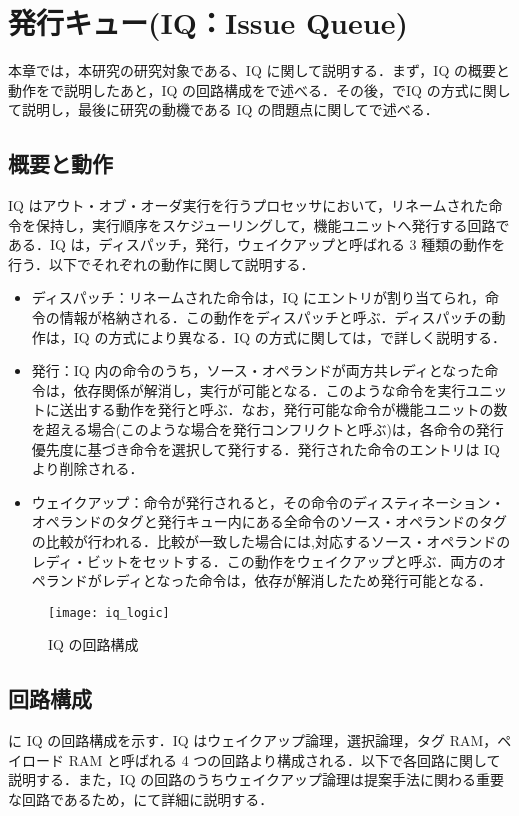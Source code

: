 
\chapter{発行キュー(IQ：Issue Queue)}
\label{sec:basic_IQ}
本章では，本研究の研究対象である、IQ に関して説明する．まず，IQ の概要と動作をで説明したあと，IQ の回路構成をで述べる．その後，でIQ の方式に関して説明し，最後に研究の動機である IQ の問題点に関してで述べる．

\section{概要と動作}
\label{sec:iq_abst}
IQ はアウト・オブ・オーダ実行を行うプロセッサにおいて，リネームされた命令を保持し，実行順序をスケジューリングして，機能ユニットへ発行する回路である．IQ は，ディスパッチ，発行，ウェイクアップと呼ばれる 3 種類の動作を行う．以下でそれぞれの動作に関して説明する．

\begin{itemize}
  \item ディスパッチ：リネームされた命令は，IQ にエントリが割り当てられ，命令の情報が格納される．この動作をディスパッチと呼ぶ．ディスパッチの動作は，IQ の方式により異なる．IQ の方式に関しては，で詳しく説明する．
  \item 発行：IQ 内の命令のうち，ソース・オペランドが両方共レディとなった命令は，依存関係が解消し，実行が可能となる．このような命令を実行ユニットに送出する動作を発行と呼ぶ．なお，発行可能な命令が機能ユニットの数を超える場合(このような場合を発行コンフリクトと呼ぶ)は，各命令の発行優先度に基づき命令を選択して発行する．発行された命令のエントリは IQ より削除される． 
  \item ウェイクアップ：命令が発行されると，その命令のディスティネーション・オペランドのタグと発行キュー内にある全命令のソース・オペランドのタグの比較が行われる．比較が一致した場合には,対応するソース・オペランドのレディ・ビットをセットする．この動作をウェイクアップと呼ぶ．両方のオペランドがレディとなった命令は，依存が解消したため発行可能となる．
\end{itemize}

\begin{figure}[thb]
  \centering
  \texttt{[image: iq\_logic]}
  \caption{IQ の回路構成}
  \label{fig:iq_logic}
\end{figure}

\section{回路構成}
\label{sec:iq_circuit}
に IQ の回路構成を示す．IQ はウェイクアップ論理，選択論理，タグ RAM，ペイロード RAM と呼ばれる 4 つの回路より構成される．以下で各回路に関して説明する．また，IQ の回路のうちウェイクアップ論理は提案手法に関わる重要な回路であるため，にて詳細に説明する．

